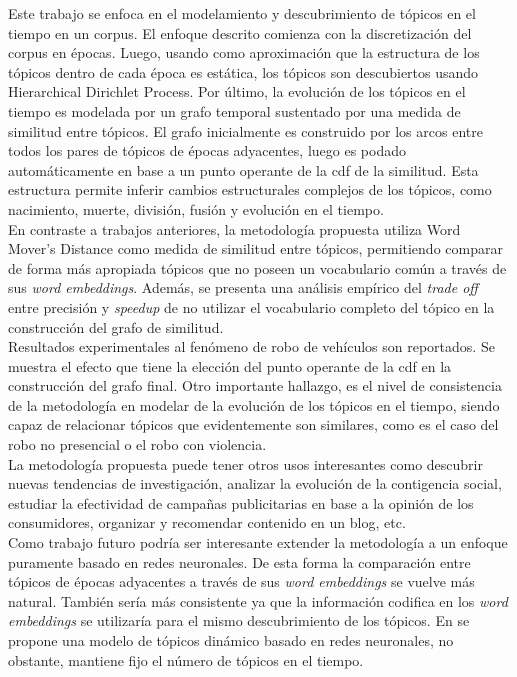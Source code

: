 Este trabajo se enfoca en el modelamiento y descubrimiento de tópicos en el tiempo en un corpus. El enfoque descrito comienza con la discretización del corpus en épocas. Luego, usando como aproximación que la estructura de los tópicos dentro de cada época es estática, los tópicos son descubiertos usando Hierarchical Dirichlet Process. Por último, la evolución de los tópicos en el tiempo es modelada por un grafo temporal sustentado por una medida de similitud entre tópicos. El grafo inicialmente es construido por los arcos entre todos los pares de tópicos de épocas adyacentes, luego es podado automáticamente en base a un punto operante de la cdf de la similitud. Esta estructura permite inferir cambios estructurales complejos de los tópicos, como nacimiento, muerte, división, fusión y evolución en el tiempo.\\

En contraste a trabajos anteriores, la metodología propuesta utiliza Word Mover's Distance como medida de similitud entre tópicos, permitiendo comparar de forma más apropiada tópicos que no poseen un vocabulario común a través de sus \textit{word embeddings}. Además, se presenta una análisis empírico del \textit{trade off} entre precisión y \textit{speedup} de no utilizar el vocabulario completo del tópico en la construcción del grafo de similitud.\\

Resultados experimentales al fenómeno de robo de vehículos son reportados. Se muestra el efecto que tiene la elección del punto operante de la cdf en la construcción del grafo final. Otro importante hallazgo, es el nivel de consistencia de la metodología en modelar de la evolución de los tópicos en el tiempo, siendo capaz de relacionar tópicos que evidentemente son similares, como es el caso del robo no presencial o el robo con violencia.\\

La metodología propuesta puede tener otros usos interesantes como descubrir nuevas tendencias de investigación, analizar la evolución de la contigencia social, estudiar la efectividad de campañas publicitarias en base a la opinión de los consumidores, organizar y recomendar contenido en un blog, etc.\\

Como trabajo futuro podría ser interesante extender la metodología a un enfoque puramente basado en redes neuronales. De esta forma la comparación entre tópicos de épocas adyacentes a través de sus \textit{word embeddings} se vuelve más natural. También sería más consistente ya que la información codifica en los \textit{word embeddings} se utilizaría para el mismo descubrimiento de los tópicos. En \cite{dieng2019dynamic} se propone una modelo de tópicos dinámico basado en redes neuronales, no obstante, mantiene fijo el número de tópicos en el tiempo.
